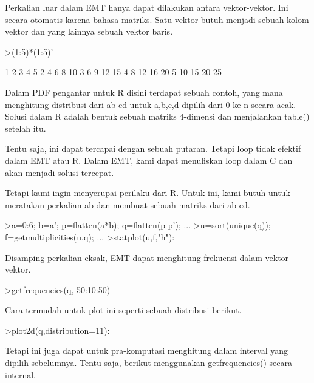 \documentclass[a4paper,10pt]{article}
\begin{document}
\begin{eulernotebook}
\begin{eulercomment}
\begin{eulercomment}
\begin{eulercomment}
\begin{eulercomment}
\begin{eulercomment}
Perkalian luar dalam EMT hanya dapat dilakukan antara vektor-vektor.
Ini secara otomatis karena bahasa matriks. Satu vektor butuh menjadi
sebuah kolom vektor dan yang lainnya sebuah vektor baris.
\end{eulercomment}
\begin{eulerprompt}
>(1:5)*(1:5)'
\end{eulerprompt}
\begin{euleroutput}
          1         2         3         4         5 
          2         4         6         8        10 
          3         6         9        12        15 
          4         8        12        16        20 
          5        10        15        20        25 
\end{euleroutput}
\begin{eulercomment}
Dalam PDF pengantar untuk R disini terdapat sebuah contoh, yang mana
menghitung distribusi dari ab-cd untuk a,b,c,d dipilih dari 0 ke n
secara acak. Solusi dalam R adalah bentuk sebuah matriks 4-dimensi dan
menjalankan table() setelah itu.

Tentu saja, ini dapat tercapai dengan sebuah putaran. Tetapi loop
tidak efektif dalam EMT atau R. Dalam EMT, kami dapat menuliskan loop
dalam C dan akan menjadi solusi tercepat.

Tetapi kami ingin menyerupai perilaku dari R. Untuk ini, kami butuh
untuk meratakan perkalian ab dan membuat sebuah matriks dari ab-cd.
\end{eulercomment}
\begin{eulerprompt}
>a=0:6; b=a'; p=flatten(a*b); q=flatten(p-p'); ...
>u=sort(unique(q)); f=getmultiplicities(u,q); ...
>statplot(u,f,"h"):
\end{eulerprompt}
\begin{eulercomment}
Disamping perkalian eksak, EMT dapat menghitung frekuensi dalam
vektor-vektor.
\end{eulercomment}
\begin{eulerprompt}
>getfrequencies(q,-50:10:50)
\end{eulerprompt}
\begin{euleroutput}
  [0,  23,  132,  316,  602,  801,  333,  141,  53,  0]
\end{euleroutput}
\begin{eulercomment}
Cara termudah untuk plot ini seperti sebuah distribusi berikut.
\end{eulercomment}
\begin{eulerprompt}
>plot2d(q,distribution=11):
\end{eulerprompt}
\begin{eulercomment}
Tetapi ini juga dapat untuk pra-komputasi menghitung dalam interval
yang dipilih sebelumnya. Tentu saja, berikut menggunakan
getfrequencies() secara internal.


\end{eulercomment}
\end{eulercomment}
\end{eulercomment}
\end{eulercomment}
\end{eulercomment}
\end{eulernotebook}
\end{document}

